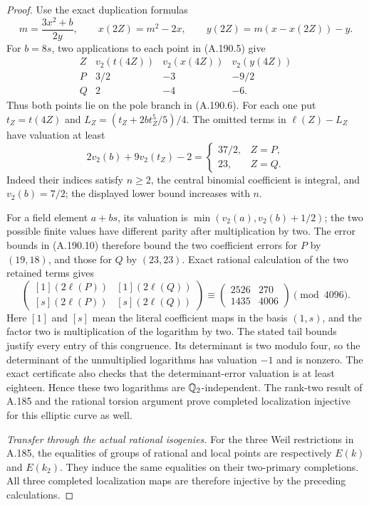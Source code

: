 \begin{proof}
Use the exact duplication formulas
\[
 m=\frac{3x^2+b}{2y},\qquad
 x(2Z)=m^2-2x,\qquad
 y(2Z)=m(x-x(2Z))-y.
\tag{A.190.8}
\]
For \(b=8s\), two applications to each point
in (A.190.5) give
\[
\begin{array}{c|c|c|c}
Z&v_2(t(4Z))&v_2(x(4Z))&v_2(y(4Z))\\ \hline
P&3/2&-3&-9/2\\
Q&2&-4&-6.
\end{array}
\tag{A.190.9}
\]
Thus both points lie on the pole branch in
(A.190.6).  For each one put \(t_Z=t(4Z)\)
and
\(L_Z=(t_Z+2bt_Z^5/5)/4\).
The omitted terms in \(\ell(Z)-L_Z\) have
valuation at least
\[
 2v_2(b)+9v_2(t_Z)-2
        =\begin{cases}37/2,&Z=P,\\23,&Z=Q.\end{cases}
\tag{A.190.10}
\]
Indeed their indices satisfy \(n\geq2\),
the central binomial coefficient is integral,
and \(v_2(b)=7/2\); the displayed lower
bound increases with \(n\).

For a field element \(a+bs\), its valuation
is \(\min(v_2(a),v_2(b)+1/2)\); the two
possible finite values have different parity
after multiplication by two.  The error bounds
in (A.190.10) therefore bound the two coefficient
errors for \(P\) by \((19,18)\), and those
for \(Q\) by \((23,23)\).  Exact rational
calculation of the two retained terms gives
\[
 \begin{pmatrix}
  [1](2\ell(P))&[1](2\ell(Q))\\
  [s](2\ell(P))&[s](2\ell(Q))
 \end{pmatrix}
 \equiv
 \begin{pmatrix}2526&270\\1435&4006\end{pmatrix}
                  \pmod{4096}.
\tag{A.190.11}
\]
Here \([1]\) and \([s]\) mean the literal
coefficient maps in the basis \((1,s)\), and
the factor two is multiplication of the logarithm
by two.  The stated tail bounds justify every
entry of this congruence.  Its determinant is
two modulo four, so the determinant of the
unmultiplied logarithms has valuation \(-1\)
and is nonzero.  The exact certificate also
checks that the determinant-error valuation is
at least eighteen.  Hence these two logarithms
are \(\mathbb Q_2\)-independent.  The rank-two result
of A.185 and the rational torsion argument prove
completed localization injective for this elliptic
curve as well.

\emph{Transfer through the actual rational isogenies.}
For the three Weil restrictions in A.185,
the equalities of groups of rational and local
points are respectively \(E(k)\) and \(E(k_2)\).
They induce the same equalities on their
two-primary completions.  All three completed
localization maps are therefore injective by
the preceding calculations.


\end{proof}
